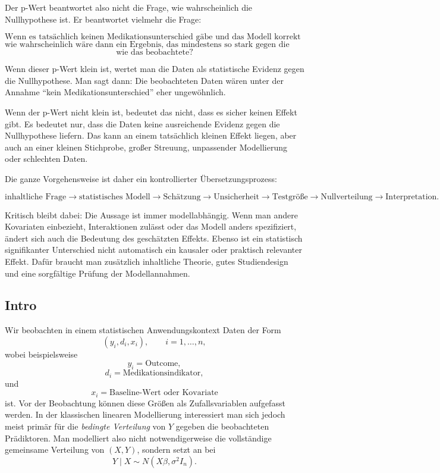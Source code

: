 \documentclass[10pt, letterpaper]{article}
\begin{document}
Der p-Wert beantwortet also nicht die Frage, wie wahrscheinlich die Nullhypothese ist. Er beantwortet vielmehr die Frage:

\[
\text{Wenn es tatsächlich keinen Medikationsunterschied gäbe und das Modell korrekt wäre,}
\]
\[
\text{wie wahrscheinlich wäre dann ein Ergebnis, das mindestens so stark gegen die Nullhypothese spricht}
\]
\[
\text{wie das beobachtete?}
\]

Wenn dieser p-Wert klein ist, wertet man die Daten als statistische Evidenz gegen die Nullhypothese. Man sagt dann: Die beobachteten Daten wären unter der Annahme ``kein Medikationsunterschied'' eher ungewöhnlich.

Wenn der p-Wert nicht klein ist, bedeutet das nicht, dass es sicher keinen Effekt gibt. Es bedeutet nur, dass die Daten keine ausreichende Evidenz gegen die Nullhypothese liefern. Das kann an einem tatsächlich kleinen Effekt liegen, aber auch an einer kleinen Stichprobe, großer Streuung, unpassender Modellierung oder schlechten Daten.

Die ganze Vorgehensweise ist daher ein kontrollierter Übersetzungsprozess:

\[
\text{inhaltliche Frage}
\longrightarrow
\text{statistisches Modell}
\longrightarrow
\text{Schätzung}
\longrightarrow
\text{Unsicherheit}
\longrightarrow
\text{Testgröße}
\longrightarrow
\text{Nullverteilung}
\longrightarrow
\text{Interpretation}.
\]

Kritisch bleibt dabei: Die Aussage ist immer modellabhängig. Wenn man andere Kovariaten einbezieht, Interaktionen zulässt oder das Modell anders spezifiziert, ändert sich auch die Bedeutung des geschätzten Effekts. Ebenso ist ein statistisch signifikanter Unterschied nicht automatisch ein kausaler oder praktisch relevanter Effekt. Dafür braucht man zusätzlich inhaltliche Theorie, gutes Studiendesign und eine sorgfältige Prüfung der Modellannahmen.

\subsection{Intro}

Wir beobachten in einem statistischen Anwendungskontext Daten der Form
\[
(y_i,d_i,x_i),\qquad i=1,\dots,n,
\]
wobei beispielsweise
\[
y_i=\text{Outcome},
\]
\[
d_i=\text{Medikationsindikator},
\]
und
\[
x_i=\text{Baseline-Wert oder Kovariate}
\]
ist. Vor der Beobachtung können diese Größen als Zufallsvariablen aufgefasst werden. In der klassischen linearen Modellierung interessiert man sich jedoch meist primär für die \emph{bedingte Verteilung} von \(Y\) gegeben die beobachteten Prädiktoren. Man modelliert also nicht notwendigerweise die vollständige gemeinsame Verteilung von \((X,Y)\), sondern setzt an bei
\[
Y\mid X\sim N(X\beta,\sigma^2I_n).
\]
\end{document}
